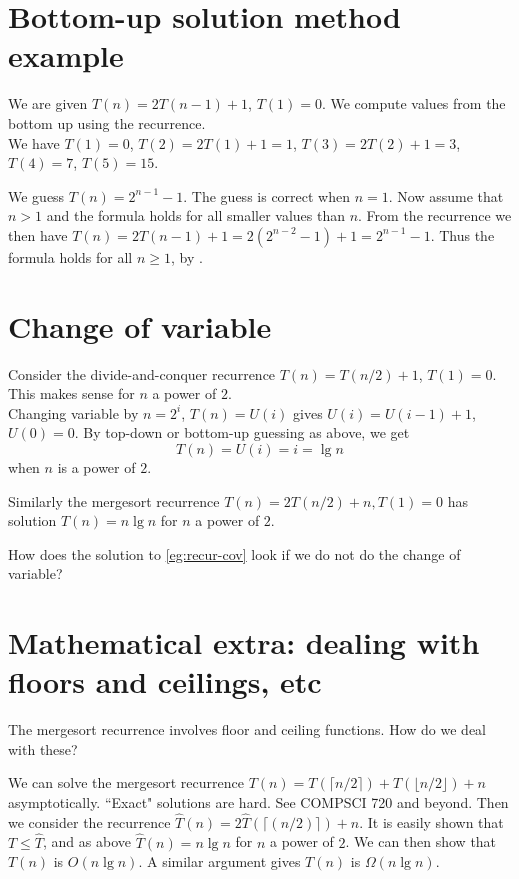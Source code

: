 \section{Bottom-up solution method example}
\begin{Boxample}
We are given $T(n) = 2 T(n - 1) + 1$, $T(1) = 0$. 
We compute values from the bottom up using the recurrence.\\


We have $T(1) = 0$, $T(2) = 2T(1) + 1 = 1$, $T(3) = 2T(2) + 1 = 3$, $T(4) = 7$, $T(5) = 15$. 

We guess $T(n) = 2^{n-1} - 1$. The guess is correct when $n = 1$.
Now assume that $n > 1$ and the formula holds for all smaller values than $n$. 
From the recurrence we then have 
$T(n) = 2T(n-1) + 1 = 2(2^{n-2} - 1) + 1 = 2^{n-1} - 1$. 
Thus the formula holds for all $n \geq 1$, by .
\end{Boxample}

\section{Change of variable}
\begin{Boxample} \label{eg:recur-cov}
Consider the divide-and-conquer recurrence $T(n) = T(n/2) + 1$, $T(1) = 0$. 
This makes sense for $n$ a power of $2$.\\

Changing variable by $n = 2^i$, $T(n) = U(i)$ 
gives $U(i) = U(i-1) + 1$, $U(0) = 0$. 
By top-down or bottom-up guessing as above, we get 
$$T(n) = U(i) =  i = \lg n$$ when $n$ is a power of $2$.

Similarly the mergesort recurrence $T(n) = 2T(n/2) + n, T(1)  = 0$ 
has solution $T(n) = n \lg n$ for $n$ a power of $2$.
\end{Boxample}

\begin{Boxample}[6]
How does the solution to \cref{eg:recur-cov} look if we do not do the change of variable?
\end{Boxample}

\section{Mathematical extra: dealing with floors and ceilings, etc}
The mergesort recurrence involves floor and ceiling functions. How do we deal with these?

We can solve the mergesort recurrence $T(n) = T(\lceil n/2 \rceil) + T(\lfloor n/2 \rfloor) + n$ asymptotically. 
``Exact" solutions are hard. See COMPSCI 720 and beyond. Then we consider the recurrence $\hat{T}(n) =
2\hat{T}(\lceil(n/2)\rceil) + n$. It is easily shown that $T \leq \hat{T}$, and 
as above $\hat{T}(n) = n \lg n$ for $n$ a power of $2$. We can then show that $T(n)$ is $O(n \lg n)$. A similar argument gives $T(n)$ is $\Omega(n \lg n)$.

